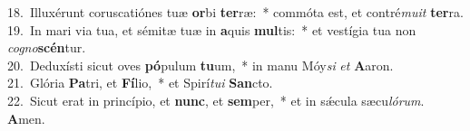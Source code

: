 {18.~}Illuxérunt coruscatiónes tuæ \textbf{or}bi \textbf{ter}ræ:~* commóta est, et contré\textit{mu}\textit{it} \textbf{ter}ra.\\
{19.~}In mari via tua, et sémitæ tuæ in \textbf{a}quis \textbf{mul}tis:~* et vestígia tua non \textit{co}\textit{gno}\textbf{scén}tur.\\
{20.~}Deduxísti sicut oves \textbf{pó}pulum \textbf{tu}um,~* in manu Móy\textit{si} \textit{et} \textbf{A}aron.\\
{21.~}Glória \textbf{Pa}tri, et \textbf{Fí}lio,~* et Spirí\textit{tu}\textit{i} \textbf{San}cto.\\
{22.~}Sicut erat in princípio, et \textbf{nunc}, et \textbf{sem}per,~* et in sǽcula sæcu\textit{ló}\textit{rum}. \textbf{A}men.\\
